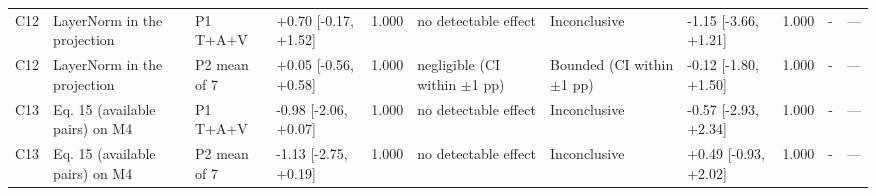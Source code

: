 \begin{table}
{\begin{tabularx}{1.42\textheight}{l>{\raggedright\arraybackslash}Xlll>{\raggedright\arraybackslash}X>{\raggedright\arraybackslash}Xll>{\raggedright\arraybackslash}Xl}
C12 & LayerNorm in the projection & P1 T+A+V & +0.70 [-0.17, +1.52] & 1.000 & no detectable effect & Inconclusive & -1.15 [-3.66, +1.21] & 1.000 & - & — \\
C12 & LayerNorm in the projection & P2 mean of 7 & +0.05 [-0.56, +0.58] & 1.000 & negligible (CI within $\pm$1 pp) & Bounded (CI within $\pm$1 pp) & -0.12 [-1.80, +1.50] & 1.000 & - & — \\
C13 & Eq. 15 (available pairs) on M4 & P1 T+A+V & -0.98 [-2.06, +0.07] & 1.000 & no detectable effect & Inconclusive & -0.57 [-2.93, +2.34] & 1.000 & - & — \\
C13 & Eq. 15 (available pairs) on M4 & P2 mean of 7 & -1.13 [-2.75, +0.19] & 1.000 & no detectable effect & Inconclusive & +0.49 [-0.93, +2.02] & 1.000 & - & — \\
\bottomrule
\end{tabularx}
}
\par{}
\end{table}
